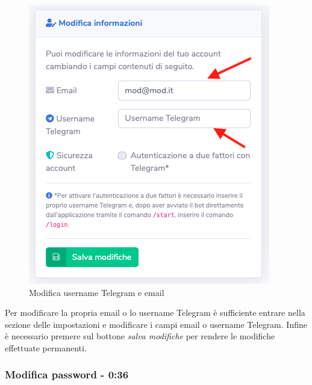 		\begin{figure}[H]
		\centering
		\includegraphics[scale=0.600]{res/images/membro/modUsername.png}
		\caption{Modifica username Telegram e email}
	\end{figure}
	Per modificare la propria email o lo username Telegram è sufficiente entrare nella sezione delle impostazioni e modificare i campi email o username Telegram.
	Infine è necessario premere sul bottone \textit{salva modifiche} per rendere le modifiche effettuate permanenti.

	\subsubsection{Modifica password - 0:36}

